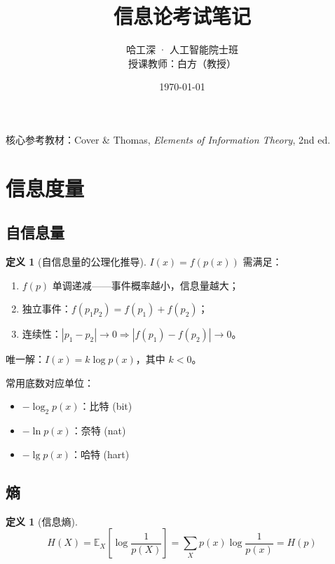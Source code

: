 \documentclass[12pt,a4paper]{ctexart}
\title{\Huge\heiti 信息论考试笔记}
\author{\large 哈工深 · 人工智能院士班 \\[2mm] 授课教师：白方（教授）}
\date{\today}
\theoremstyle{definition}
\newtheorem{definition}[theorem]{定义}
\begin{document}
\maketitle
\thispagestyle{empty}
\vfill
\begin{center}
  \large\heiti 核心参考教材：Cover \& Thomas, \textit{Elements of Information Theory}, 2nd ed.
\end{center}
\newpage

\tableofcontents
\newpage

\section{信息度量}

\subsection{自信息量}

\begin{definition}[自信息量的公理化推导]
$I(x) = f(p(x))$ 需满足：
\begin{enumerate}[label=(\arabic*)]
  \item $f(p)$ 单调递减——事件概率越小，信息量越大；
  \item 独立事件：$f(p_1p_2) = f(p_1) + f(p_2)$；
  \item 连续性：$|p_1-p_2| \to 0 \Rightarrow |f(p_1)-f(p_2)| \to 0$。
\end{enumerate}
唯一解：$I(x) = k\log p(x)$，其中 $k < 0$。
\end{definition}

常用底数对应单位：
\begin{itemize}[nosep]
  \item $-\log_2 p(x)$：比特 (bit)
  \item $-\ln p(x)$：奈特 (nat)
  \item $-\lg p(x)$：哈特 (hart)
\end{itemize}

\subsection{熵}

\begin{definition}[信息熵]
\[
H(X) = \mathbb{E}_X\left[\log\frac{1}{p(X)}\right] = \sum_X p(x)\log\frac{1}{p(x)} = H(p)
\]
\end{definition}
\end{document}
